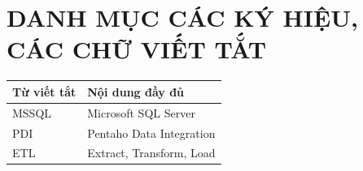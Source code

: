 \documentclass{article}[13pt]
\begin{document}








{}
{}


\renewcommand{\listfigurename}{\makebox[\linewidth]{DANH MỤC HÌNH ẢNH}}


\listoffigures


\pagebreak


{}
{}



\renewcommand{\listtablename}{\makebox[\linewidth]{DANH MỤC CÁC BẢNG SỐ LIỆU}}

\listoftables



\pagebreak
{}
{}
\section*{\textbf{DANH MỤC CÁC KÝ HIỆU, CÁC CHỮ VIẾT TẮT}}

\begin{center}
\begin{tabular}{|p{3cm}|p{7cm}|}
\hline
\textbf{Từ viết tắt} & \textbf{Nội dung đầy đủ} \\
\hline
MSSQL & Microsoft SQL Server \\
\hline
PDI & Pentaho Data Integration \\
\hline
ETL & Extract, Transform, Load \\
\hline
\end{tabular}
\end{center}
\end{document}
